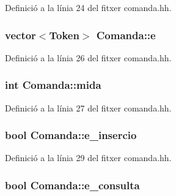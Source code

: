 Definició a la línia 24 del fitxer comanda.\+hh.

\hypertarget{class_comanda_a4792137ffe62e366d017c085798e1de7}{}
\subsubsection[{e}]{\setlength{\rightskip}{0pt plus 5cm}vector$<${\bf Token}$>$ Comanda\+::e\hspace{0.3cm}{\ttfamily [private]}}\label{class_comanda_a4792137ffe62e366d017c085798e1de7}


Definició a la línia 26 del fitxer comanda.\+hh.

\hypertarget{class_comanda_abaf613f247586557027ad5857ace89c2}{}
\subsubsection[{mida}]{\setlength{\rightskip}{0pt plus 5cm}int Comanda\+::mida\hspace{0.3cm}{\ttfamily [private]}}\label{class_comanda_abaf613f247586557027ad5857ace89c2}


Definició a la línia 27 del fitxer comanda.\+hh.

\hypertarget{class_comanda_afa50474d0c9c08da1f3042cfddc9df24}{}
\subsubsection[{e\+\_\+insercio}]{\setlength{\rightskip}{0pt plus 5cm}bool Comanda\+::e\+\_\+insercio\hspace{0.3cm}{\ttfamily [private]}}\label{class_comanda_afa50474d0c9c08da1f3042cfddc9df24}


Definició a la línia 29 del fitxer comanda.\+hh.

\hypertarget{class_comanda_a558a2944c2306c12df9f889fc96a58dd}{}
\subsubsection[{e\+\_\+consulta}]{\setlength{\rightskip}{0pt plus 5cm}bool Comanda\+::e\+\_\+consulta\hspace{0.3cm}{\ttfamily [private]}}\label{class_comanda_a558a2944c2306c12df9f889fc96a58dd}


